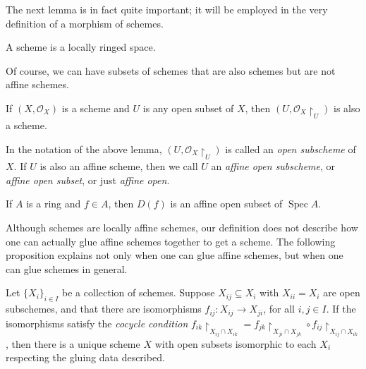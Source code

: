 \documentclass[11pt,openany]{book} %
\newcommand{\spc}{\operatorname{Spec}}
\begin{document}
The next lemma is in fact quite important; it will be employed in the very definition of a morphism of schemes.\\

\begin{lemma}
A scheme is a locally ringed space.
\end{lemma}
\medskip

Of course, we can have subsets of schemes that are also schemes but are not affine schemes.\\

\begin{lemma}
If $(X, \mathcal{O}_X)$ is a scheme and $U$ is any open subset of $X$, then $(U, \mathcal{O}_X\restriction_U)$ is also a scheme.
\end{lemma}
\medskip

\begin{definition}
In the notation of the above lemma, $(U, \mathcal{O}_X\restriction_U)$ is called an \emph{open subscheme} of $X$. If $U$ is also an affine scheme, then we call $U$ an \emph{affine open subscheme}, or \emph{affine open subset}, or just \emph{affine open}.
\end{definition}

\begin{example}
If $A$ is a ring and $f \in A$, then $D(f)$ is an affine open subset of $\spc A$.
\end{example}

Although schemes are locally affine schemes, our definition does not describe how one can actually glue affine schemes together to get a scheme. The following proposition explains not only when one can glue affine schemes, but when one can glue schemes in general.\\

\begin{proposition}
Let $\{X_i\}_{i \in I}$ be a collection of schemes. Suppose $X_{ij} \subseteq X_i$ with $X_{ii} = X_i$ are open subschemes, and that there are isomorphisms $f_{ij} : X_{ij} \to X_{ji}$, for all $i,j \in I$. If the isomorphisms satisfy the \emph{cocycle condition} $f_{ik}\restriction_{X_{ij} \cap X_{ik}} = f_{jk}\restriction_{X_{ji} \cap X_{jk}} \circ f_{ij}\restriction_{X_{ij} \cap X_{ik}}$, then there is a unique scheme $X$ with open subsets isomorphic to each $X_i$ respecting the gluing data described.
\end{proposition}
\end{document}
